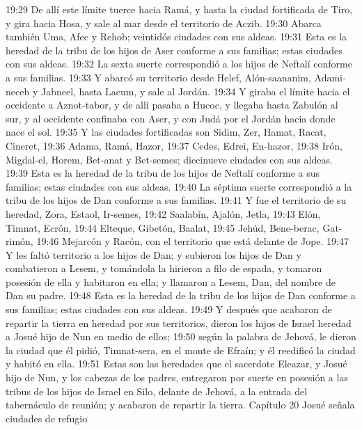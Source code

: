 19:29 De allí este límite tuerce hacia Ramá, y hasta la ciudad fortificada de Tiro, y gira hacia Hosa, y sale al mar desde el territorio de Aczib.  
19:30 Abarca también Uma, Afec y Rehob; veintidós ciudades con sus aldeas.  
19:31 Esta es la heredad de la tribu de los hijos de Aser conforme a sus familias; estas ciudades con sus aldeas.  
19:32 La sexta suerte correspondió a los hijos de Neftalí conforme a sus familias.  
19:33 Y abarcó su territorio desde Helef, Alón-saananim, Adami- neceb y Jabneel, hasta Lacum, y sale al Jordán.  
19:34 Y giraba el límite hacia el occidente a Aznot-tabor, y de allí pasaba a Hucoc, y llegaba hasta Zabulón al sur, y al occidente confinaba con Aser, y con Judá por el Jordán hacia donde nace el sol.  
19:35 Y las ciudades fortificadas son Sidim, Zer, Hamat, Racat, Cineret,  
19:36 Adama, Ramá, Hazor,  
19:37 Cedes, Edrei, En-hazor,  
19:38 Irón, Migdal-el, Horem, Bet-anat y Bet-semes; diecinueve ciudades con sus aldeas.  
19:39 Esta es la heredad de la tribu de los hijos de Neftalí conforme a sus familias; estas ciudades con sus aldeas.  
19:40 La séptima suerte correspondió a la tribu de los hijos de Dan conforme a sus familias.  
19:41 Y fue el territorio de su heredad, Zora, Estaol, Ir-semes,  
19:42 Saalabín, Ajalón, Jetla,  
19:43 Elón, Timnat, Ecrón,  
19:44 Elteque, Gibetón, Baalat,  
19:45 Jehúd, Bene-berac, Gat-rimón,  
19:46 Mejarcón y Racón, con el territorio que está delante de Jope.  
19:47 Y les faltó territorio a los hijos de Dan; y subieron los hijos de Dan y combatieron a Lesem, y tomándola la hirieron a filo de espada, y tomaron posesión de ella y habitaron en ella; y llamaron a Lesem, Dan, del nombre de Dan su padre. 
19:48 Esta es la heredad de la tribu de los hijos de Dan conforme a sus familias; estas ciudades con sus aldeas. 
19:49 Y después que acabaron de repartir la tierra en heredad por sus territorios, dieron los hijos de Israel heredad a Josué hijo de Nun en medio de ellos;  
19:50 según la palabra de Jehová, le dieron la ciudad que él pidió, Timnat-sera, en el monte de Efraín; y él reedificó la ciudad y habitó en ella.  
19:51 Estas son las heredades que el sacerdote Eleazar, y Josué hijo de Nun, y los cabezas de los padres, entregaron por suerte en posesión a las tribus de los hijos de Israel en Silo, delante de Jehová, a la entrada del tabernáculo de reunión; y acabaron de repartir la tierra. 
Capítulo 20 
Josué señala ciudades de refugio  

